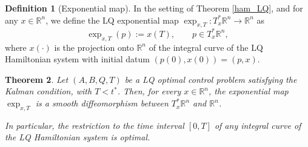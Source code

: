 \documentclass[reqno]{amsart}
\theoremstyle{plain}
\newtheorem{thm}{Theorem}[section]
\theoremstyle{definition}
\newtheorem{Def}[thm]{Definition}
\theoremstyle{remark}
\newcommand{\R}{\mathbb{R}}
\begin{document}
    \begin{Def}[Exponential map]
        In the setting of Theorem \ref{ham_LQ}, and for any $x\in\mathbb{R}^n$, we define the LQ exponential map $\exp_{x,T}:T^*_x\mathbb{R}^n\to\mathbb{R}^n$ as
		\begin{equation}
		\exp_{x,T}(p):=x(T), \qquad p \in T_x^*\R^n,
		\end{equation}
        where $x(\cdot)$ is the projection onto $\mathbb{R}^n$ of the integral curve of the LQ Hamiltonian system with initial datum $(p(0),x(0))=(p,x)$.
    \end{Def}
    
\begin{thm}\label{LQ_exponential}
		  Let $(A,B,Q,T)$ be a LQ optimal control problem satisfying the Kalman condition, with $T<t^*$. Then, for every $x\in\mathbb{R}^n$, the exponential map $\exp_{x,T}$ is a smooth diffeomorphism between $T^*_x\mathbb{R}^n$ and $\mathbb{R}^n$.
        
		  In particular, the restriction to the time interval $[0,T]$ of any integral curve of the LQ Hamiltonian system is optimal.
	\end{thm}
\end{document}

